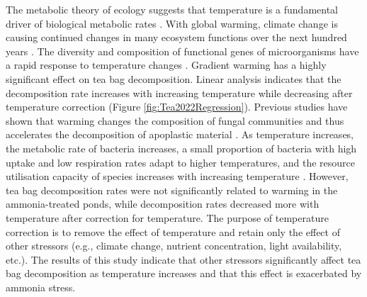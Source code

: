 \documentclass[11pt, a4paper]{article}
\begin{document}
\begin{spacing}{1.5}
The metabolic theory of ecology suggests that temperature is a fundamental driver of biological metabolic rates \citep{brown2004toward}. With global warming, climate change is causing continued changes in many ecosystem functions over the next hundred years \citep{smith2018predicted}. The diversity and composition of functional genes of microorganisms have a rapid response to temperature changes \citep{barria2013bacterial,wu2017alpine,xue2016tundra}. Gradient warming has a highly significant effect on tea bag decomposition. Linear analysis indicates that the decomposition rate increases with increasing temperature while decreasing after temperature correction (Figure \ref{fig:Tea2022Regression}). Previous studies have shown that warming changes the composition of fungal communities and thus accelerates the decomposition of apoplastic material \citep{dang2009temperature}. As temperature increases, the metabolic rate of bacteria increases, a small proportion of bacteria with high uptake and low respiration rates adapt to higher temperatures, and the resource utilisation capacity of species increases with increasing temperature \citep{smith2019community}. However, tea bag decomposition rates were not significantly related to warming in the ammonia-treated ponds, while decomposition rates decreased more with temperature after correction for temperature. The purpose of temperature correction is to remove the effect of temperature and retain only the effect of other stressors (e.g., climate change, nutrient concentration, light availability, etc.). The results of this study indicate that other stressors significantly affect tea bag decomposition as temperature increases and that this effect is exacerbated by ammonia stress.


\end{spacing}
\end{document}
